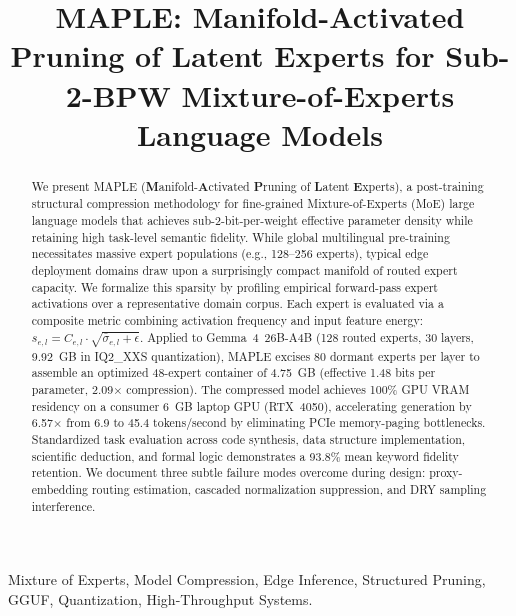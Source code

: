 \documentclass[conference]{IEEEtran}
\newcommand{\MAPLE}{\textsc{MAPLE}}
\begin{document}
\title{\MAPLE: Manifold-Activated Pruning of Latent Experts for Sub-2-BPW Mixture-of-Experts Language Models}

\author{
}

\maketitle

\begin{abstract}
We present \MAPLE{} (\textbf{M}anifold-\textbf{A}ctivated \textbf{P}runing of \textbf{L}atent \textbf{E}xperts), a post-training structural compression methodology for fine-grained Mixture-of-Experts (MoE) large language models that achieves sub-2-bit-per-weight effective parameter density while retaining high task-level semantic fidelity. While global multilingual pre-training necessitates massive expert populations (e.g., 128--256 experts), typical edge deployment domains draw upon a surprisingly compact manifold of routed expert capacity. We formalize this sparsity by profiling empirical forward-pass expert activations over a representative domain corpus. Each expert is evaluated via a composite metric combining activation frequency and input feature energy: $s_{e,l} = C_{e,l} \cdot \sqrt{\bar{\sigma}_{e,l} + \epsilon}$. Applied to Gemma~4~26B-A4B (128 routed experts, 30 layers, 9.92~GB in IQ2\_XXS quantization), \MAPLE{} excises 80 dormant experts per layer to assemble an optimized 48-expert container of 4.75~GB (effective 1.48 bits per parameter, 2.09$\times$ compression). The compressed model achieves 100\% GPU VRAM residency on a consumer 6~GB laptop GPU (RTX~4050), accelerating generation by 6.57$\times$ from 6.9 to 45.4 tokens/second by eliminating PCIe memory-paging bottlenecks. Standardized task evaluation across code synthesis, data structure implementation, scientific deduction, and formal logic demonstrates a 93.8\% mean keyword fidelity retention. We document three subtle failure modes overcome during design: proxy-embedding routing estimation, cascaded normalization suppression, and DRY sampling interference.
\end{abstract}

\begin{IEEEkeywords}
Mixture of Experts, Model Compression, Edge Inference, Structured Pruning, GGUF, Quantization, High-Throughput Systems.
\end{IEEEkeywords}
\end{document}
